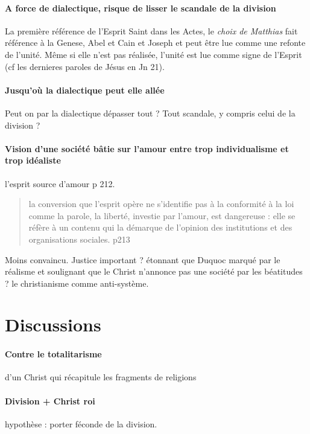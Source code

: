 \paragraph{A force de dialectique, risque de lisser le scandale de la division} La première référence de l'Esprit Saint dans les Actes, le \textit{choix de Matthias} fait référence à la Genese, Abel et Cain et Joseph et peut être lue comme une refonte de l'unité.
Même si elle n'est pas réalisée, l'unité est lue comme signe de l'Esprit (cf les dernieres paroles de Jésus en Jn 21).


\paragraph{Jusqu'où la dialectique peut elle allée} Peut on par la dialectique dépasser tout ? Tout scandale, y compris celui de la division ? 


\paragraph{Vision d'une société bâtie sur l'amour entre trop individualisme et trop idéaliste}
  l'esprit source d'amour p 212. 
\begin{quote}
    la conversion que l'esprit opère ne s'identifie pas à la conformité à la loi  comme la parole, la liberté, investie par l'amour, est dangereuse : elle se réfère à un contenu qui la démarque de l'opinion des institutions et des organisations sociales. p213
\end{quote} Moins convaincu. Justice important ? étonnant que Duquoc marqué par le réalisme et soulignant que le Christ n'annonce pas une société par les béatitudes ?
le christianisme comme anti-système. 


\section{Discussions}

\paragraph{Contre le totalitarisme} d'un Christ qui récapitule les fragments de religions

\paragraph{Division + Christ roi} hypothèse : porter féconde de la division. 

